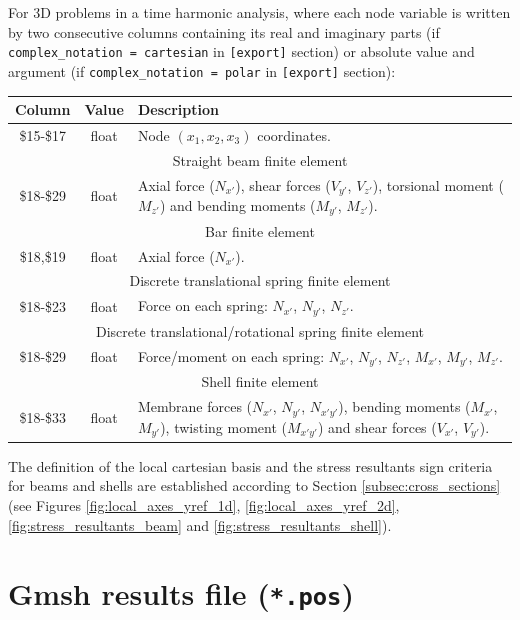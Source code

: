 \documentclass[a4paper,fleqn]{book}
\begin{document}
For 3D problems in a time harmonic analysis, where each node variable is written by two consecutive columns containing its real and imaginary parts (if \texttt{complex\_notation = cartesian} in \texttt{[export]} section) or absolute value and argument (if \texttt{complex\_notation = polar} in \texttt{[export]} section):
\begin{longtable}{ccp{11cm}}
\textbf{Column} & \textbf{Value} &\textbf{Description} \\ 
\endhead
\midrule
\$15-\$17 & float & Node $(x_1,x_2,x_3)$ coordinates. \\
\midrule
\multicolumn{3}{c}{Straight beam finite element} \\
\$18-\$29 & float & Axial force ($N_{x'}$), shear forces ($V_{y'}$, $V_{z'}$), torsional moment ($M_{z'}$) and bending moments ($M_{y'}$, $M_{z'}$). \\
\midrule
\multicolumn{3}{c}{Bar finite element} \\
\$18,\$19 & float & Axial force ($N_{x'}$). \\
\midrule
\multicolumn{3}{c}{Discrete translational spring finite element} \\
\$18-\$23 & float & Force on each spring: $N_{x'}$, $N_{y'}$, $N_{z'}$. \\
\midrule
\multicolumn{3}{c}{Discrete translational/rotational spring finite element} \\
\$18-\$29 & float & Force/moment on each spring: $N_{x'}$, $N_{y'}$, $N_{z'}$, $M_{x'}$, $M_{y'}$, $M_{z'}$. \\
\midrule
\multicolumn{3}{c}{Shell finite element} \\
\$18-\$33 & float & Membrane forces ($N_{x'}$, $N_{y'}$, $N_{x'y'}$), bending moments ($M_{x'}$, $M_{y'}$), twisting moment ($M_{x'y'}$) and shear forces ($V_{x'}$, $V_{y'}$).
\end{longtable}

The definition of the local cartesian basis and the stress resultants sign criteria for beams and shells are established according to Section \ref{subsec:cross_sections} (see Figures \ref{fig:local_axes_yref_1d}, \ref{fig:local_axes_yref_2d}, \ref{fig:stress_resultants_beam} and \ref{fig:stress_resultants_shell}).


\section{Gmsh results file (\texttt{*.pos})}
\end{document}
